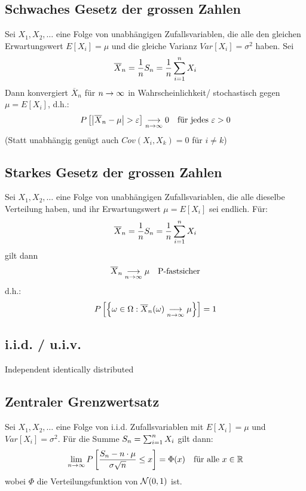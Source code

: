 \subsection*{Schwaches Gesetz der grossen Zahlen}
Sei $X_1, X_2, \dots$ eine Folge von unabhängigen Zufallsvariablen, die alle
den gleichen Erwartungswert $E[X_i] = \mu$ und die gleiche Varianz $Var[X_i] =
  \sigma^2$ haben. Sei
\begin{align*}
  \overline{X}_n = \frac{1}{n} S_n = \frac{1}{n} \sum_{i = 1}^n X_i
\end{align*}
Dann konvergiert $\overline{X}_n$ für $n \rightarrow \infty$ in Wahrscheinlichkeit/
stochastisch gegen $\mu = E[X_i]$, d.h.:
\begin{align*}
  P \left[ \abs{\overline{X}_n - \mu} > \varepsilon \right] \underset{n \rightarrow \infty}{\longrightarrow} 0
   &  & \text{für jedes } \varepsilon > 0
\end{align*}
(Statt unabhängig genügt auch $Cov (X_i, X_k) = 0$ für $i \neq k$)
\subsection*{Starkes Gesetz der grossen Zahlen}
Sei $X_1, X_2, \dots$ eine Folge von unabhängigen Zufallsvariablen, die alle
dieselbe Verteilung haben, und ihr Erwartungswert $\mu = E[X_i]$ sei endlich.
Für:
\begin{align*}
  \overline{X}_n = \frac{1}{n} S_n = \frac{1}{n} \sum_{i = 1}^n X_i
\end{align*}
gilt dann
\begin{align*}
  \overline{X}_n \underset{n \rightarrow \infty}{\longrightarrow} \mu &  & \text{P-fastsicher}
\end{align*}
d.h.:
\begin{align*}
  P \left[ \left\{ \omega \in \Omega : \overline{X}_n (\omega) \underset{n \rightarrow \infty}{\longrightarrow} \mu \right\} \right] = 1
\end{align*}
\subsection*{i.i.d. / u.i.v.}
Independent identically distributed
\subsection*{Zentraler Grenzwertsatz}
Sei $X_1, X_2, \dots$ eine Folge von i.i.d. Zufallsvariablen mit $E[X_i] = \mu$
und $Var[X_i] = \sigma^2$. Für die Summe $S_n = \sum_{i = 1}^n X_i$ gilt dann:
\begin{align*}
  \lim_{n \rightarrow \infty} P \left[ \frac{S_n - n \cdot \mu}{\sigma \sqrt{n}} \leq x \right] = \Phi (x)
   &  & \text{für alle } x \in \mathbb{R}
\end{align*}
wobei $\Phi$ die Verteilungsfunktion von $\mathcal{N} (0, 1)$ ist.